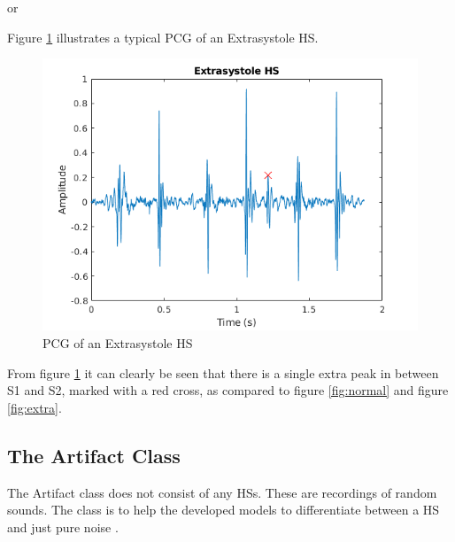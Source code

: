 \documentclass[10pt,twocolumn]{witseiepaper}
\begin{document}
\hspace{3.5cm} or 


Figure \ref{fig:extrasys} illustrates a typical PCG of an Extrasystole HS.
\begin{figure}[h!]
    \centering
    \includegraphics[scale = 0.45]{./extrasys.png}
    \caption{PCG of an Extrasystole HS}
    \label{fig:extrasys}
\end{figure}{}

From figure \ref{fig:extrasys} it can clearly be seen that there is a single extra peak in between S1 and S2, marked with a red cross, as compared to figure \ref{fig:normal} and figure \ref{fig:extra}.

\subsection*{The Artifact Class}
\label{sec:arti}
The Artifact class does not consist of any HSs. These are recordings of random sounds. The class is to help the developed models to differentiate between a HS and just pure noise \cite{bentley}.
\end{document}
